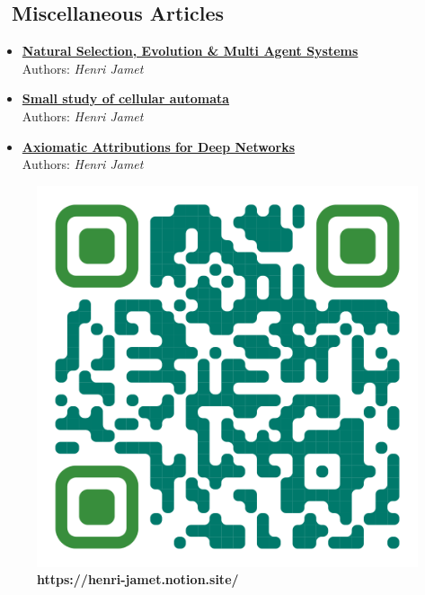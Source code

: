 \begin{multicols}{2}
\columnbreak

\subsection{\articlesdiversicon~\textcolor{Overleaf_green}{Miscellaneous Articles}}
\begin{itemize}
  \item \href{https://henri-jamet.notion.site/tude-de-la-S-lection-naturelle-au-moyen-d-une-simulation-multi-agents-88f57904e2a94503a0d91bb99f7d1941}{\textbf{Natural Selection, Evolution \& Multi Agent Systems} \linkicon}\\
  Authors: \textit{Henri Jamet}
  
  \item \href{https://henri-jamet.notion.site/Small-study-of-cellular-automata-352e858c867e4cf3a960651f33738cb5}{\textbf{Small study of cellular automata} \linkicon}\\
  Authors: \textit{Henri Jamet}
  
  \item \href{https://henri-jamet.notion.site/Attributions-Axiomatiques-pour-les-R-seaux-Profonds-146fdf9f541b48738a7c60a2ad669ed8?pvs=4}{\textbf{Axiomatic Attributions for Deep Networks} \linkicon}\\
  Authors: \textit{Henri Jamet}
\end{itemize}

\end{multicols}

\begin{figure}[h]
  \centering
  \begin{adjustbox}{max width=0.2\textwidth}
    \includegraphics{Img/QR.png}
  \end{adjustbox}
  \caption{\textbf{https://henri-jamet.notion.site/}}
\end{figure}